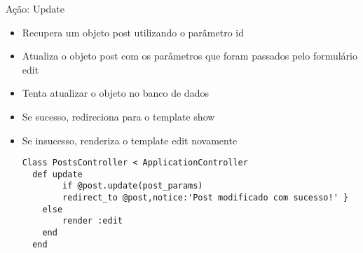 \begin{frame}{Ação: Update}
	\begin{itemize}
		\item Recupera um objeto \alert{post} utilizando o parâmetro \alert{id}	
		\item Atualiza o objeto \alert{post} com os parâmetros que foram passados pelo
			formulário \alert{edit}
		\item Tenta \alert{atualizar} o objeto no \alert{banco de dados}
		\item Se sucesso, redireciona para o template \alert{show}
		\item Se insucesso, renderiza o template \alert{edit} novamente
		\begin{lstlisting}[style=RubyInputStyle, caption=posts\_controller.rb]
Class PostsController < ApplicationController
  def update
		if @post.update(post_params)
    	redirect_to @post,notice:'Post modificado com sucesso!' }
    else
    	render :edit
    end
  end
  	\end{lstlisting}				
	\end{itemize}	
\end{frame}


